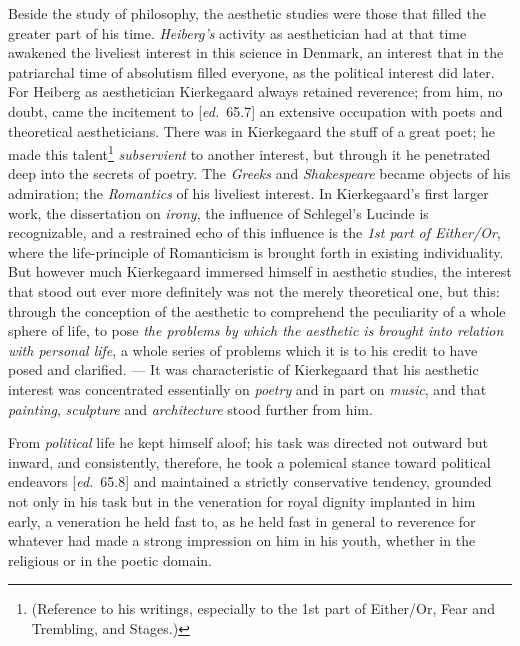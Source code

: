 \documentclass[12pt,a4paper,openany]{book}
\newcommand{\kpage}[1]{\marginnote{\footnotesize\textit{[#1]}}}
\newcommand{\ed}[1]{{\small[\textit{ed.}\ #1]}}
\begin{document}
Beside the study of philosophy, the aesthetic studies were
those that filled the greater part of his time. \emph{Heiberg's} activity as aesthetician
had at that time awakened the liveliest interest in this science
in Denmark, an interest that in the patriarchal time of absolutism
filled everyone, as the political interest did later. For
Heiberg as aesthetician Kierkegaard always retained reverence;
from him, no doubt, came the incitement to \ed{65.7} an extensive
occupation with poets and theoretical aestheticians. There
was in Kierkegaard the stuff of a great poet; he made this talent\footnote[27]{(Reference to his writings, especially to the 1st part of Either/Or, Fear and Trembling, and
Stages.)}
\emph{subservient} to another interest, but through it he penetrated deep
into the secrets of poetry. The \emph{Greeks} and \emph{Shakespeare} became objects
of his admiration; the \emph{Romantics} of his liveliest interest.
In Kierkegaard's first larger work, the dissertation on
\emph{irony}, the influence of Schlegel's Lucinde is recognizable, and a restrained
echo of this influence is the \emph{1st part of Either/Or},
where the life-principle of Romanticism is brought forth in existing individuality.
But however much Kierkegaard immersed himself in aesthetic
studies, the interest that stood out ever more definitely was
not the merely theoretical one, but this: through the conception of the aesthetic
to comprehend the peculiarity of a whole sphere of life, to pose \emph{the
problems by which the aesthetic is brought into relation with personal life}, a whole
\kpage{102}series of problems which it is to his credit to have posed and
clarified. --- It was characteristic of Kierkegaard that his aesthetic
interest was concentrated essentially on \emph{poetry} and in part on \emph{music},
and that \emph{painting}, \emph{sculpture} and \emph{architecture} stood further from him.

From \emph{political} life he kept himself aloof; his task was directed not
outward but inward, and consistently, therefore, he took a polemical stance
toward political endeavors \ed{65.8} and maintained a strictly conservative
tendency, grounded not only in his task but in the veneration for royal
dignity implanted in him early, a veneration he held fast to, as he held fast
in general to reverence for whatever had made a strong impression on him in his
youth, whether in the religious or in the poetic domain.
\end{document}
